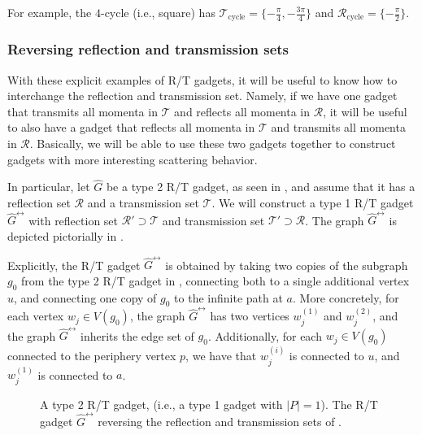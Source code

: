 \documentclass[../thesis-main/thesis-main]{subfiles}
\begin{document}
For example, the $4$-cycle (i.e., square) has $\mathcal{T}_{\mathrm{cycle}} = \{-\frac{\pi}{4},-\frac{3\pi}{4}\}$ and $\mathcal{R}_{\mathrm{cycle}} = \{-\frac{\pi}{2}\}$.  

\subsubsection{Reversing reflection and transmission sets}\label{sec:reversal}

With these explicit examples of R/T gadgets, it will be useful to know how to interchange the reflection and transmission set.  Namely, if we have one gadget that transmits all momenta in $\mathcal{T}$ and reflects all momenta in $\mathcal{R}$, it will be useful to also have a gadget that reflects all momenta in $\mathcal{T}$ and transmits all momenta in $\mathcal{R}$.  Basically, we will be able to use these two gadgets together to construct gadgets with more interesting scattering behavior.

In particular, let $\widehat{G}$ be a type 2 R/T gadget, as seen in , and assume that it has a reflection set $\mathcal{R}$ and a transmission set $\mathcal{T}$.  We will construct a type 1 R/T gadget $\widehat{G}^{\leftrightarrow}$ with reflection set $\mathcal{R'} \supset \mathcal{T}$ and transmission set $\mathcal{T}' \supset \mathcal{R}$.  The graph $\widehat{G}^{\leftrightarrow}$ is depicted pictorially in .

Explicitly, the R/T gadget $\widehat{G}^\leftrightarrow$ is obtained by taking two copies of the subgraph $g_0$ from the type 2 R/T gadget in , connecting both to a single additional vertex $u$, and connecting one copy of $g_0$ to the infinite path at $a$.  More concretely, for each vertex $w_j\in V(g_0)$, the graph $\widehat{G}^{\leftrightarrow}$ has two vertices $w_j^{(1)}$ and $w_j^{(2)}$, and the graph $\widehat{G}^\leftrightarrow$ inherits the edge set of $g_0$.  Additionally, for each $w_j\in V(g_0)$ connected to the periphery vertex $p$, we have that $w_j^{(i)}$ is connected to $u$, and $w_j^{(1)}$ is connected to $a$.

\begin{figure}
  \centering
  \qquad
   \caption{  A type 2 R/T gadget, (i.e., a type 1 gadget with $|P| = 1$).    The R/T gadget $\widehat{G}^\leftrightarrow$ reversing the reflection and transmission sets of .}
   \label{fig:reversal}
\end{figure}
\end{document}
